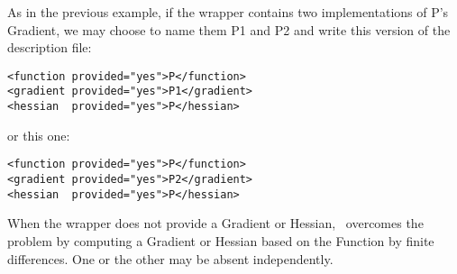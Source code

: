As in the previous example, if the wrapper contains two implementations of P's Gradient, we may choose to name them P1 and P2 and write this version of the description file:

\lstset{language=C++, basicstyle=\normalsize}
\begin{lstlisting}[frame=TBRL]
<function provided="yes">P</function>
<gradient provided="yes">P1</gradient>
<hessian  provided="yes">P</hessian>
\end{lstlisting}

or this one:

\lstset{language=C++, basicstyle=\normalsize}
\begin{lstlisting}[frame=TBRL]
<function provided="yes">P</function>
<gradient provided="yes">P2</gradient>
<hessian  provided="yes">P</hessian>
\end{lstlisting}

When the wrapper does not provide a Gradient or Hessian, \OT\ overcomes the problem by computing a Gradient or Hessian based on the Function by finite differences. One or the other may be absent independently.
